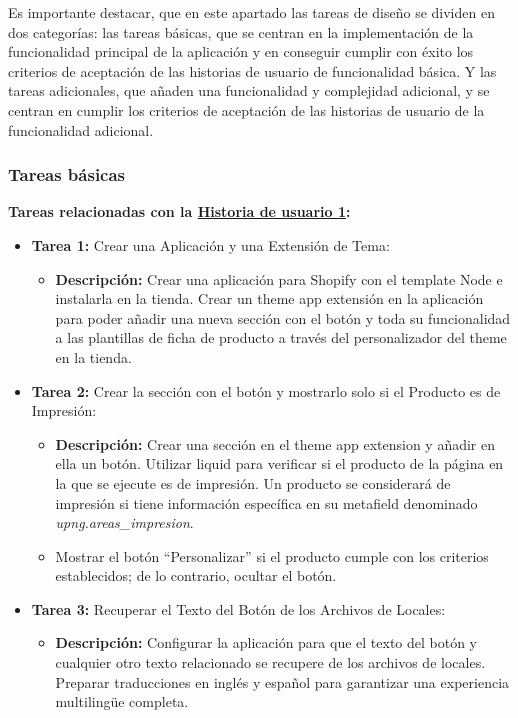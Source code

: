 \documentclass[12pt]{article}
\begin{document}
Es importante destacar, que en este apartado las tareas de diseño se dividen en dos categorías: las tareas básicas, que se centran en la implementación de la funcionalidad
principal de la aplicación y en conseguir cumplir con éxito los criterios de aceptación de las historias de usuario de funcionalidad básica. Y las tareas adicionales, que 
añaden una funcionalidad y complejidad adicional, y se centran en cumplir los criterios de aceptación de las historias de usuario de la funcionalidad adicional.


\subsubsection{Tareas básicas}

\textbf{Tareas relacionadas con la \hyperref[sec:historia1]{Historia de usuario 1}:}
\begin{itemize}
    \item \textbf{Tarea 1:} Crear una Aplicación y una Extensión de Tema:
          \begin{itemize}[label=--]
              \item \textbf{Descripción:} Crear una aplicación para Shopify con el template Node e instalarla en la tienda. Crear un theme app extensión en la aplicación para poder añadir una nueva sección con el botón y toda su funcionalidad a las plantillas de ficha de producto a través del personalizador del theme en la tienda.
          \end{itemize}
    \item \textbf{Tarea 2:} Crear la sección con el botón y mostrarlo solo si el Producto es de Impresión:
          \begin{itemize}[label=--]
              \item \textbf{Descripción:} Crear una sección en el theme app extension y añadir en ella un botón. Utilizar liquid para verificar si el producto de la página en la que se ejecute es de impresión. Un producto se considerará de impresión si tiene información específica en su metafield denominado \textit{upng.areas\_impresion}.
              \item Mostrar el botón ``Personalizar'' si el producto cumple con los criterios establecidos; de lo contrario, ocultar el botón.
          \end{itemize}
    \item \textbf{Tarea 3:} Recuperar el Texto del Botón de los Archivos de Locales:
          \begin{itemize}[label=--]
              \item \textbf{Descripción:} Configurar la aplicación para que el texto del botón y cualquier otro texto relacionado se recupere de los archivos de locales. Preparar traducciones en inglés y español para garantizar una experiencia multilingüe completa.
          \end{itemize}
\end{itemize}
\end{document}
